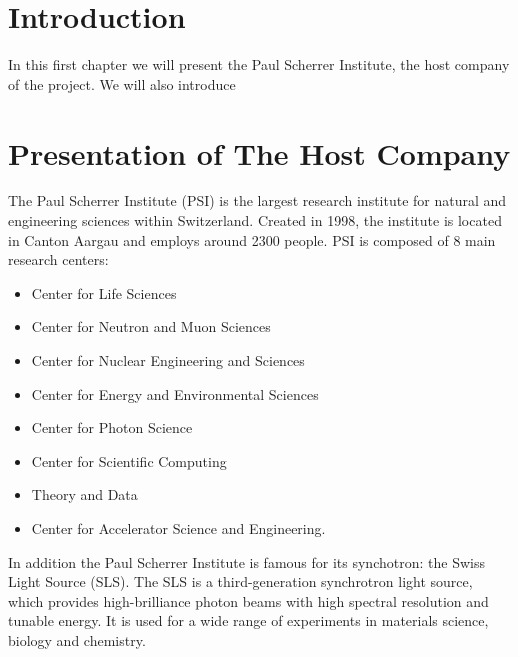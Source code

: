 \begin{spacing}{1.2}

    \section*{Introduction}
    In this first chapter we will present the Paul Scherrer Institute, the host company of the project.
    We will also introduce 

    \section{Presentation of The Host Company}
    The Paul Scherrer Institute (PSI) is the largest research institute for natural and engineering sciences within Switzerland.
    Created in 1998, the institute is located in Canton Aargau and employs around 2300 people.
    PSI is composed of 8 main research centers:
    \begin{itemize}
        \item Center for Life Sciences
        \item Center for Neutron and Muon Sciences
        \item Center for Nuclear Engineering and Sciences
        \item Center for Energy and Environmental Sciences
        \item Center for Photon Science
        \item Center for Scientific Computing
        \item Theory and Data
        \item Center for Accelerator Science and Engineering.
    \end{itemize}

    In addition the Paul Scherrer Institute is famous for its synchotron: the Swiss Light Source (SLS).
    The SLS is a third-generation synchrotron light source, which provides high-brilliance photon beams
    with high spectral resolution and tunable energy. It is used for a wide range of experiments in materials science,
    biology and chemistry. \cite{boge2002first, aboutSLS, PhysRevLett.128.024801}










\end{spacing}
